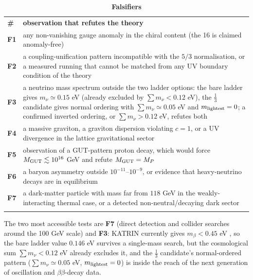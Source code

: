 \documentclass[aps,prd,twocolumn,amsmath,amssymb,superscriptaddress,nofootinbib,floatfix]{revtex4-2}
\newcommand{\grayhline}{\noalign{\vskip1pt{\color{black!30}\hrule height 0.3pt}\color{black}\vskip3pt}}
\begin{document}
\begin{table}[t]
\caption{\textbf{Falsifiers}}
\label{tab:7}
\footnotesize
\begin{tabular}{@{}p{}p{}@{}}
\toprule
\textbf{\#} & \textbf{observation that refutes the theory} \\ \addlinespace[2pt] \midrule
\textbf{F1} & any non-vanishing gauge anomaly in the chiral content (the 16 is claimed
anomaly-free) \\ \addlinespace[2pt]
\grayhline
\textbf{F2} & a coupling-unification pattern incompatible with the \(5/3\)
normalisation, or a measured running that cannot be matched from any UV
boundary condition of the theory \\ \addlinespace[2pt]
\grayhline
\textbf{F3} & a neutrino mass spectrum outside the two ladder options: the bare ladder
gives \(m_\nu \simeq 0.15\) eV (already excluded by
\(\sum m_\nu < 0.12\) eV), the \(\tfrac13\) candidate gives normal
ordering with \(\sum m_\nu \simeq 0.05\) eV and
\(m_{\rm lightest} = 0\); a confirmed inverted ordering, or
\(\sum m_\nu > 0.12\) eV, refutes both \\ \addlinespace[2pt]
\grayhline
\textbf{F4} & a massive graviton, a graviton dispersion violating \(c = 1\), or a UV
divergence in the lattice gravitational sector \\ \addlinespace[2pt]
\grayhline
\textbf{F5} & observation of a GUT-pattern proton decay, which would force
\(M_{\rm GUT} \lesssim 10^{16}\) GeV and refute \(M_{\rm GUT} = M_P\) \\ \addlinespace[2pt]
\grayhline
\textbf{F6} & a baryon asymmetry outside \(10^{-11}\)--\(10^{-9}\), or evidence that
heavy-neutrino decays are in equilibrium \\ \addlinespace[2pt]
\grayhline
\textbf{F7} & a dark-matter particle with mass far from \(118\) GeV in the
weakly-interacting thermal case, or a detected non-neutral/decaying dark
sector \\ \addlinespace[2pt] \bottomrule
\end{tabular}
\end{table}

The two most accessible tests are \textbf{F7} (direct detection and
collider searches around the 100 GeV scale) and \textbf{F3}: KATRIN
currently gives \(m_\beta < 0.45\) eV \cite{ref16}, so the bare ladder
value \(0.146\) eV survives a single-mass search, but the cosmological
sum \(\sum m_\nu < 0.12\) eV already excludes it, and the \(\tfrac13\)
candidate's normal-ordered pattern (\(\sum m_\nu \simeq 0.05\) eV,
\(m_{\rm lightest} = 0\)) is inside the reach of the next generation of
oscillation and \(\beta\beta\)-decay data.
\end{document}
